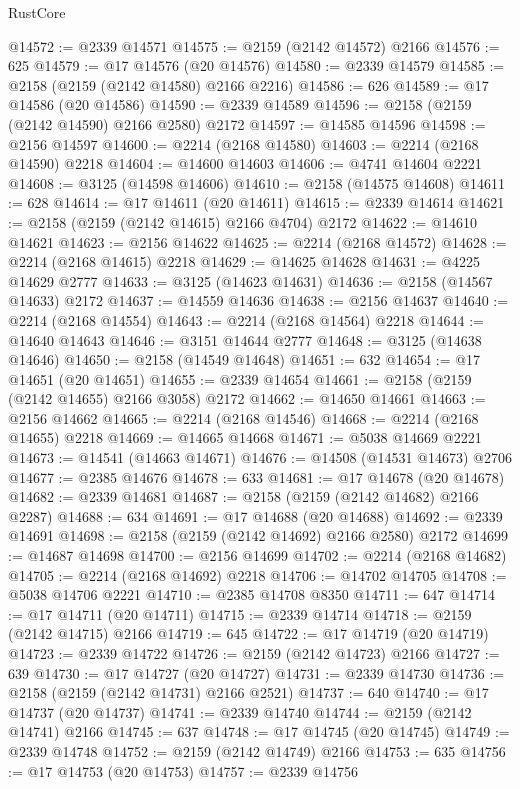 \begin{lexlean}{RustCore}
\begin{coremodule}
@14572 := @2339 @14571
@14575 := @2159 (@2142 @14572) @2166
@14576 := 625
@14579 := @17 @14576 (@20 @14576)
@14580 := @2339 @14579
@14585 := @2158 (@2159 (@2142 @14580) @2166 @2216)
@14586 := 626
@14589 := @17 @14586 (@20 @14586)
@14590 := @2339 @14589
@14596 := @2158 (@2159 (@2142 @14590) @2166 @2580) @2172
@14597 := @14585 @14596
@14598 := @2156 @14597
@14600 := @2214 (@2168 @14580)
@14603 := @2214 (@2168 @14590) @2218
@14604 := @14600 @14603
@14606 := @4741 @14604 @2221
@14608 := @3125 (@14598 @14606)
@14610 := @2158 (@14575 @14608)
@14611 := 628
@14614 := @17 @14611 (@20 @14611)
@14615 := @2339 @14614
@14621 := @2158 (@2159 (@2142 @14615) @2166 @4704) @2172
@14622 := @14610 @14621
@14623 := @2156 @14622
@14625 := @2214 (@2168 @14572)
@14628 := @2214 (@2168 @14615) @2218
@14629 := @14625 @14628
@14631 := @4225 @14629 @2777
@14633 := @3125 (@14623 @14631)
@14636 := @2158 (@14567 @14633) @2172
@14637 := @14559 @14636
@14638 := @2156 @14637
@14640 := @2214 (@2168 @14554)
@14643 := @2214 (@2168 @14564) @2218
@14644 := @14640 @14643
@14646 := @3151 @14644 @2777
@14648 := @3125 (@14638 @14646)
@14650 := @2158 (@14549 @14648)
@14651 := 632
@14654 := @17 @14651 (@20 @14651)
@14655 := @2339 @14654
@14661 := @2158 (@2159 (@2142 @14655) @2166 @3058) @2172
@14662 := @14650 @14661
@14663 := @2156 @14662
@14665 := @2214 (@2168 @14546)
@14668 := @2214 (@2168 @14655) @2218
@14669 := @14665 @14668
@14671 := @5038 @14669 @2221
@14673 := @14541 (@14663 @14671)
@14676 := @14508 (@14531 @14673) @2706
@14677 := @2385 @14676
@14678 := 633
@14681 := @17 @14678 (@20 @14678)
@14682 := @2339 @14681
@14687 := @2158 (@2159 (@2142 @14682) @2166 @2287)
@14688 := 634
@14691 := @17 @14688 (@20 @14688)
@14692 := @2339 @14691
@14698 := @2158 (@2159 (@2142 @14692) @2166 @2580) @2172
@14699 := @14687 @14698
@14700 := @2156 @14699
@14702 := @2214 (@2168 @14682)
@14705 := @2214 (@2168 @14692) @2218
@14706 := @14702 @14705
@14708 := @5038 @14706 @2221
@14710 := @2385 @14708 @8350
@14711 := 647
@14714 := @17 @14711 (@20 @14711)
@14715 := @2339 @14714
@14718 := @2159 (@2142 @14715) @2166
@14719 := 645
@14722 := @17 @14719 (@20 @14719)
@14723 := @2339 @14722
@14726 := @2159 (@2142 @14723) @2166
@14727 := 639
@14730 := @17 @14727 (@20 @14727)
@14731 := @2339 @14730
@14736 := @2158 (@2159 (@2142 @14731) @2166 @2521)
@14737 := 640
@14740 := @17 @14737 (@20 @14737)
@14741 := @2339 @14740
@14744 := @2159 (@2142 @14741) @2166
@14745 := 637
@14748 := @17 @14745 (@20 @14745)
@14749 := @2339 @14748
@14752 := @2159 (@2142 @14749) @2166
@14753 := 635
@14756 := @17 @14753 (@20 @14753)
@14757 := @2339 @14756

\end{coremodule}
\end{lexlean}
